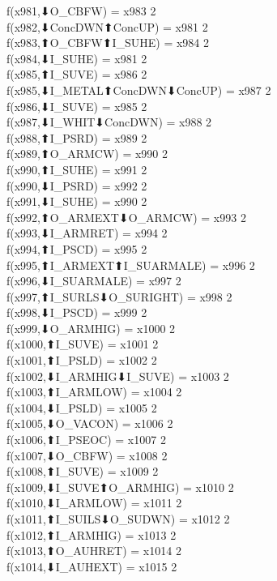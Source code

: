 f(x981,⬇O_CBFW) = x983 {2} \\
f(x982,⬇ConcDWN⬆ConcUP) = x981 {2} \\
f(x983,⬆O_CBFW⬆I_SUHE) = x984 {2} \\
f(x984,⬇I_SUHE) = x981 {2} \\
f(x985,⬆I_SUVE) = x986 {2} \\
f(x985,⬇I_METAL⬆ConcDWN⬇ConcUP) = x987 {2} \\
f(x986,⬇I_SUVE) = x985 {2} \\
f(x987,⬇I_WHIT⬇ConcDWN) = x988 {2} \\
f(x988,⬆I_PSRD) = x989 {2} \\
f(x989,⬆O_ARMCW) = x990 {2} \\
f(x990,⬆I_SUHE) = x991 {2} \\
f(x990,⬇I_PSRD) = x992 {2} \\
f(x991,⬇I_SUHE) = x990 {2} \\
f(x992,⬆O_ARMEXT⬇O_ARMCW) = x993 {2} \\
f(x993,⬇I_ARMRET) = x994 {2} \\
f(x994,⬆I_PSCD) = x995 {2} \\
f(x995,⬆I_ARMEXT⬆I_SUARMALE) = x996 {2} \\
f(x996,⬇I_SUARMALE) = x997 {2} \\
f(x997,⬆I_SURLS⬇O_SURIGHT) = x998 {2} \\
f(x998,⬇I_PSCD) = x999 {2} \\
f(x999,⬇O_ARMHIG) = x1000 {2} \\
f(x1000,⬆I_SUVE) = x1001 {2} \\
f(x1001,⬆I_PSLD) = x1002 {2} \\
f(x1002,⬇I_ARMHIG⬇I_SUVE) = x1003 {2} \\
f(x1003,⬆I_ARMLOW) = x1004 {2} \\
f(x1004,⬇I_PSLD) = x1005 {2} \\
f(x1005,⬇O_VACON) = x1006 {2} \\
f(x1006,⬆I_PSEOC) = x1007 {2} \\
f(x1007,⬇O_CBFW) = x1008 {2} \\
f(x1008,⬆I_SUVE) = x1009 {2} \\
f(x1009,⬇I_SUVE⬆O_ARMHIG) = x1010 {2} \\
f(x1010,⬇I_ARMLOW) = x1011 {2} \\
f(x1011,⬆I_SUILS⬇O_SUDWN) = x1012 {2} \\
f(x1012,⬆I_ARMHIG) = x1013 {2} \\
f(x1013,⬆O_AUHRET) = x1014 {2} \\
f(x1014,⬇I_AUHEXT) = x1015 {2} \\
